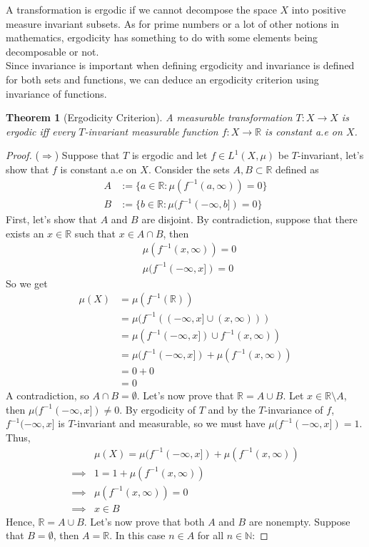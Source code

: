 \documentclass{article}
\newtheorem{theorem}{Theorem}[section]
\theoremstyle{definition}
\begin{document}
A transformation is ergodic if we cannot decompose the space $X$ into positive measure invariant subsets. As for prime numbers or a lot of other notions in mathematics, ergodicity has something to do with some elements being decomposable or not.\\
Since invariance is important when defining ergodicity and invariance is defined for both sets and functions, we can deduce an ergodicity criterion using invariance of functions.

\begin{theorem}[Ergodicity Criterion]\label{Criterion}
    A measurable transformation  $T:X\to X$ is ergodic iff every $T$-invariant measurable function $f:X\to \mathbb{R}$ is constant a.e on $X$.
\end{theorem}

\begin{proof}
    ($\Rightarrow$) Suppose that $T$ is ergodic and let $f\in L^1(X,\mu)$ be $T$-invariant, let's show that $f$ is constant a.e on $X$.
    Consider the sets $A,B\subset\mathbb{R}$ defined as
    \begin{align*}
        A &:= \{a\in\mathbb{R}:\mu(f^{-1}(a,\infty))=0\} \\
        B &:= \{b\in\mathbb{R}:\mu(f^{-1}(-\infty,b])=0\}
    \end{align*}
    First, let's show that $A$ and $B$ are disjoint. By contradiction, suppose that there exists an $x\in\mathbb{R}$ such that $x\in A\cap B$, then 
    \begin{align*}
        &\mu(f^{-1}(x,\infty))=0 \\
        &\mu(f^{-1}(-\infty,x])=0
    \end{align*}
    So we get
    \begin{align*}
        \mu(X) &= \mu(f^{-1}(\mathbb{R})) \\
          &= \mu(f^{-1}((-\infty,x]\cup (x,\infty))) \\
          &= \mu(f^{-1}(-\infty,x])\cup f^{-1}(x,\infty)) \\
          &= \mu(f^{-1}(-\infty,x])+ \mu(f^{-1}(x,\infty)) \\
          &= 0 + 0 \\
          &= 0
    \end{align*}
    A contradiction, so $A\cap B = \emptyset$.
    Let's now prove that $\mathbb{R} = A\cup B$. Let $x\in \mathbb{R}\setminus A$, then $\mu(f^{-1}(-\infty, x])\neq 0$. By ergodicity of $T$ and by the $T$-invariance of $f$, $f^{-1}(-\infty, x]$ is $T$-invariant and measurable, so we must have $\mu(f^{-1}(-\infty, x])=1$. Thus,
    \begin{align*}
        & \mu(X) = \mu(f^{-1}(-\infty,x])+ \mu(f^{-1}(x,\infty)) \\
        \implies   & 1 = 1 + \mu(f^{-1}(x,\infty))\\
        \implies  & \mu(f^{-1}(x,\infty)) = 0\\
        \implies & x\in B
    \end{align*}
    Hence, $\mathbb{R} = A\cup B$. Let's now prove that both $A$ and $B$ are nonempty. Suppose that $B=\emptyset$, then $A=\mathbb{R}$. In this case $n\in A$ for all $n\in \mathbb{N}$:
    

\end{proof}
\end{document}
